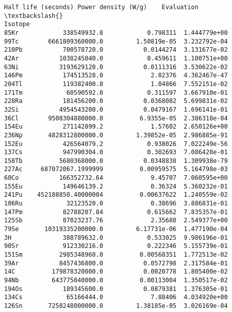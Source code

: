 \documentclass[11pt]{article}
\begin{document}
\begin{tcolorbox}[breakable, size=fbox, boxrule=.5pt, pad at break*=1mm, opacityfill=0]
\begin{Verbatim}[commandchars=\\\{\}]
        Half life (seconds) Power density (W/g)    Evaluation  \textbackslash{}
Isotope
85Kr            338549932.8            0.798311  1.444779e+00
99Tc        6661809360000.0         1.50819e-05  3.232792e-04
210Pb           700578720.0           0.0144274  3.131677e-02
42Ar           1038245040.0            0.459611  1.100751e+00
63Ni           3193629120.0           0.0111316  3.530622e-02
146Pm           174513528.0             2.02376  4.362467e-47
204Tl           119382400.8             1.04866  7.552151e-02
171Tm            60590592.0            0.311597  3.667910e-01
228Ra           181456200.0           0.0368082  5.699831e-02
32Si           4954543200.0           0.0479167  1.696141e-01
36Cl        9508304880000.0          6.9355e-05  2.386318e-04
154Eu           271142899.2             1.57602  2.650126e+00
236Np       4828312800000.0         1.39852e-05  2.986885e-91
152Eu           426564079.2            0.938026  7.022249e-56
137Cs           947990304.0            0.302693  7.086428e-01
158Tb          5680368000.0           0.0348838  1.309938e-79
227Ac     687072067.1999999          0.00959575  5.164798e-03
60Co           166352732.64             9.45707  7.060595e+00
155Eu           149646139.2             0.36324  5.360232e-01
241Pu    452188850.40000004          0.00637622  1.240559e-02
106Ru            32123520.0             0.38696  3.886831e-01
147Pm           82788207.84            0.615662  7.835357e-01
125Sb           87023237.76             2.35688  2.549377e+00
79Se       10319335200000.0         6.17731e-06  1.477190e-04
3H              388789632.0            0.533025  9.986196e-01
90Sr            912330216.0            0.222346  5.155739e-01
151Sm          2985348960.0          0.00568351  1.772513e-02
39Ar           8457436800.0           0.0572798  2.317584e-01
14C          179878320000.0           0.0020778  1.805400e-02
94Nb         643775040000.0          0.00113004  1.350517e-02
194Os           189345600.0           0.0879381  1.376305e-01
134Cs            65166444.0             7.88406  4.034920e+00
126Sn       7258248000000.0         1.38185e-05  3.026169e-04


\end{Verbatim}
\end{tcolorbox}
\end{document}
